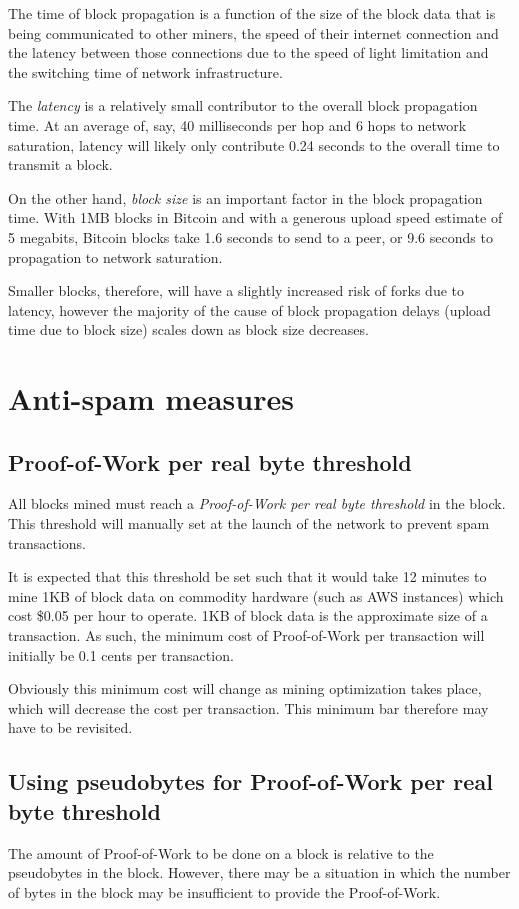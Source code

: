 \documentclass[a4paper,12pt]{article}
\begin{document}
The time of block propagation is a function of the size of the block data that is being communicated to other miners, the speed of their internet connection and the latency between those connections due to the speed of light limitation and the switching time of network infrastructure. 

The \textit{latency} is a relatively small contributor to the overall block propagation time. At an average of, say, 40 milliseconds per hop and 6 hops to network saturation, latency will likely only contribute 0.24 seconds to the overall time to transmit a block.

On the other hand, \textit{block size} is an important factor in the block propagation time. With 1MB blocks in Bitcoin and with a generous upload speed estimate of 5 megabits, Bitcoin blocks take 1.6 seconds to send to a peer, or 9.6 seconds to propagation to network saturation.

Smaller blocks, therefore, will have a slightly increased risk of forks due to latency, however the majority of the cause of block propagation delays (upload time due to block size) scales down as block size decreases. 






\section{Anti-spam measures}
\subsection{Proof-of-Work per real byte threshold}
All blocks mined must reach a \textit{Proof-of-Work per real byte threshold} in the block. This threshold will manually set at the launch of the network to prevent spam transactions. 

It is expected that this threshold be set such that it would take 12 minutes to mine 1KB of block data on commodity hardware (such as AWS instances) which cost \$0.05 per hour to operate. 1KB of block data is the approximate size of a transaction. As such, the minimum cost of Proof-of-Work per transaction will initially be 0.1 cents per transaction. 

Obviously this minimum cost will change as mining optimization takes place, which will decrease the cost per transaction. This minimum bar therefore may have to be revisited.


\subsection{Using pseudobytes for Proof-of-Work per real byte threshold}
The amount of Proof-of-Work to be done on a block is relative to the pseudobytes in the block. However, there may be a situation in which the number of bytes in the block may be insufficient to provide the Proof-of-Work. 
\end{document}
